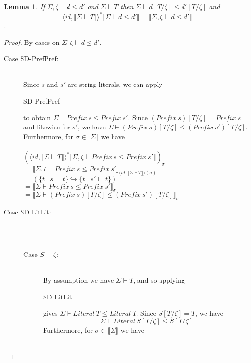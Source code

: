 \documentclass{article}
\newtheorem{lemma}{Lemma}
\newcommand{\sem}[1]{\llbracket #1 \rrbracket}
\begin{document}
\begin{lemma}
If $\Sigma,\zeta \vdash d \leq d'$ and $\Sigma \vdash T$ then $\Sigma \vdash d[T/\zeta] \leq d'[T/\zeta]$ and 
$$\langle \mathit{id}, \sem{\Sigma \vdash T} \rangle^* \sem{\Sigma \vdash d \leq d'} = \sem{\Sigma,\zeta \vdash d \leq d'}$$.
\label{SD-Subst}
\end{lemma}

\begin{proof}
By cases on $\Sigma,\zeta \vdash d \leq d'$.
\begin{description}
\item[Case SD-PrefPref:]~\\
Since $s$ and $s'$ are string literals, we can apply \begin{sc}SD-PrefPref\end{sc} to obtain $\Sigma \vdash \mathit{Prefix}~s \leq \mathit{Prefix}~s'$. Since $(\mathit{Prefix}~s)[T/\zeta] = \mathit{Prefix}~s$ and likewise for $s'$, we have $\Sigma \vdash (\mathit{Prefix}~s)[T/\zeta] \leq (\mathit{Prefix}~s')[T/\zeta]$. Furthermore, for $\sigma \in \sem{\Sigma}$ we have\\~\\ 
$(\langle \mathit{id}, \sem{\Sigma \vdash T} \rangle^* \sem{\Sigma,\zeta \vdash \mathit{Prefix}~s \leq \mathit{Prefix}~s'})_\sigma$\\
$= \sem{\Sigma,\zeta \vdash \mathit{Prefix}~s \leq \mathit{Prefix}~s'}_{\langle \mathit{id}, \sem{\Sigma \vdash T} \rangle(\sigma)}$\\
$= (\{ t \mid s \sqsubseteq t \} \hookrightarrow \{ t \mid s' \sqsubseteq t \})$\\
$= \sem{\Sigma \vdash \mathit{Prefix}~s \leq \mathit{Prefix}~s'}_{\sigma}$\\
$= \sem{\Sigma \vdash (\mathit{Prefix}~s)[T/\zeta] \leq (\mathit{Prefix}~s')[T/\zeta]}_{\sigma}$
\item[Case SD-LitLit:]~\\
~
\begin{description}
\item[Case $S = \zeta$:]~\\
By assumption we have $\Sigma \vdash T$, and so applying \begin{sc}SD-LitLit\end{sc} gives $\Sigma \vdash \mathit{Literal}~T \leq \mathit{Literal}~T$. Since $S[T/\zeta] = T$, we have $$\Sigma \vdash \mathit{Literal}~S[T/\zeta] \leq S[T/\zeta]$$
Furthermore, for $\sigma \in \sem{\Sigma}$ we have\\~\\

\end{description}
\end{description}
\end{proof}
\end{document}
